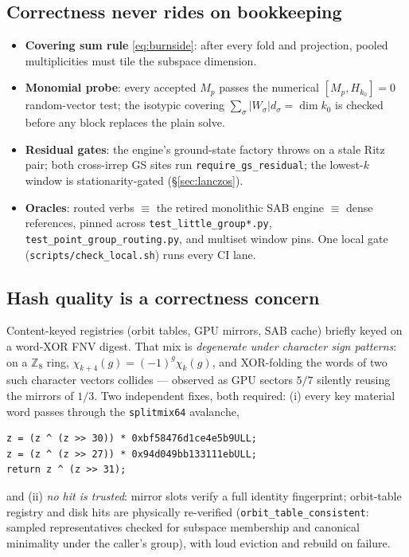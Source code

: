 \documentclass[11pt]{article}
\newcommand{\Z}{\mathbb{Z}}
\newcommand{\file}[1]{\texttt{\small #1}}
\begin{document}
\subsection{Correctness never rides on bookkeeping}

\begin{itemize}
\item \textbf{Covering sum rule} \eqref{eq:burnside}: after every fold and
  projection, pooled multiplicities must tile the subspace dimension.
\item \textbf{Monomial probe}: every accepted $M_p$ passes the numerical
  $[M_p, H_{k_0}] = 0$ random-vector test; the isotypic covering
  $\sum_\sigma |W_\sigma| d_\sigma = \dim k_0$ is checked before any block
  replaces the plain solve.
\item \textbf{Residual gates}: the engine's ground-state factory throws on
  a stale Ritz pair; both cross-irrep GS sites run
  \texttt{require\_gs\_residual}; the lowest-$k$ window is
  stationarity-gated (\S\ref{sec:lanczos}).
\item \textbf{Oracles}: routed verbs $\equiv$ the retired monolithic SAB
  engine $\equiv$ dense references, pinned across
  \file{test\_little\_group*.py}, \file{test\_point\_group\_routing.py},
  and multiset window pins. One local gate
  (\file{scripts/check\_local.sh}) runs every CI lane.
\end{itemize}

\subsection{Hash quality is a correctness concern}
\label{sec:hashing}

Content-keyed registries (orbit tables, GPU mirrors, SAB cache) briefly
keyed on a word-XOR FNV digest. That mix is \emph{degenerate under
character sign patterns}: on a $\Z_8$ ring,
$\chi_{k+4}(g) = (-1)^g \chi_k(g)$, and XOR-folding the words of two such
character vectors collides --- observed as GPU sectors $5/7$ silently
reusing the mirrors of $1/3$. Two independent fixes, both required:
(i) every key material word passes through the \texttt{splitmix64}
avalanche,
\begin{lstlisting}
z = (z ^ (z >> 30)) * 0xbf58476d1ce4e5b9ULL;
z = (z ^ (z >> 27)) * 0x94d049bb133111ebULL;
return z ^ (z >> 31);
\end{lstlisting}
and (ii) \emph{no hit is trusted}: mirror slots verify a full identity
fingerprint; orbit-table registry and disk hits are physically re-verified
(\texttt{orbit\_table\_consistent}: sampled representatives checked for
subspace membership and canonical minimality under the caller's group),
with loud eviction and rebuild on failure.
\end{document}
